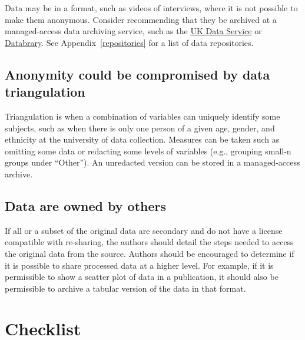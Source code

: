 \documentclass[
  oneside]{book}
\begin{document}
Data may be in a format, such as videos of interviews, where it is not possible to make them anonymous. Consider recommending that they be archived at a managed-access data archiving service, such as the \href{https://ukdataservice.ac.uk/deposit-data/}{UK Data Service} or \href{https://databrary.org/about/agreement.html}{Databrary}. See Appendix~\ref{repositories} for a list of data repositories.

\hypertarget{anonymity-could-be-compromised-by-data-triangulation}{%
\subsection{Anonymity could be compromised by data triangulation}\label{anonymity-could-be-compromised-by-data-triangulation}}

Triangulation is when a combination of variables can uniquely identify some subjects, such as when there is only one person of a given age, gender, and ethnicity at the university of data collection. Measures can be taken such as omitting some data or redacting some levels of variables (e.g., grouping small-n groups under ``Other''). An unredacted version can be stored in a managed-access archive.

\hypertarget{data-are-owned-by-others}{%
\subsection{Data are owned by others}\label{data-are-owned-by-others}}

If all or a subset of the original data are secondary and do not have a license compatible with re-sharing, the authors should detail the steps needed to access the original data from the source. Authors should be encouraged to determine if it is possible to share processed data at a higher level. For example, if it is permissible to show a scatter plot of data in a publication, it should also be permissible to archive a tabular version of the data in that format.

\hypertarget{checklist-2}{%
\section{Checklist}\label{checklist-2}}
\end{document}
